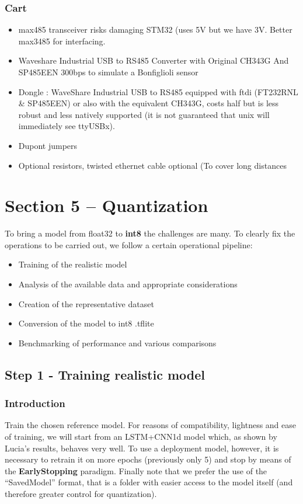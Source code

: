 \subsubsection{Cart}

\begin{itemize}
    \item max485 transceiver risks damaging STM32 (uses 5V but we have 3V. Better max3485 for interfacing.
    \item Waveshare Industrial USB to RS485 Converter with Original CH343G And SP485EEN 300bps to simulate a Bonfiglioli sensor
    \item Dongle : WaveShare Industrial USB to RS485 equipped with ftdi (FT232RNL \& SP485EEN) or also with the equivalent CH343G, costs half but is less robust and less natively supported (it is not guaranteed that unix will immediately see ttyUSBx).
    \item Dupont jumpers
    \item Optional resistors, twisted ethernet cable optional (To cover long distances
\end{itemize}

\section{Section 5 -- Quantization}

To bring a model from float32 to \textbf{int8} the challenges are many. To clearly fix the operations to be carried out, we follow a certain operational pipeline:

\begin{itemize}
    \item Training of the realistic model
    \item Analysis of the available data and appropriate considerations
    \item Creation of the representative dataset
    \item Conversion of the model to int8 .tflite
    \item Benchmarking of performance and various comparisons
\end{itemize}

\subsection{Step 1 - Training realistic model}

\subsubsection{Introduction}
Train the chosen reference model. For reasons of compatibility, lightness and ease of training, we will start from an LSTM+CNN1d model which, as shown by Lucia's results, behaves very well. To use a deployment model, however, it is necessary to retrain it on more epochs (previously only 5) and stop by means of the \textbf{EarlyStopping} paradigm. Finally note that we prefer the use of the ``SavedModel'' format, that is a folder with easier access to the model itself (and therefore greater control for quantization).

